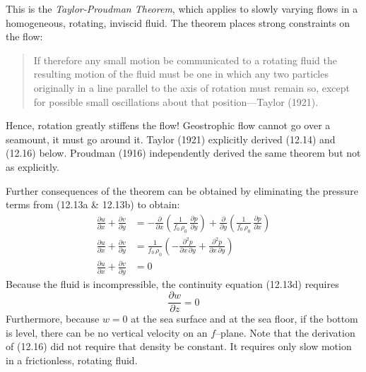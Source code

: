 This is the \textit{Taylor-Proudman Theorem}, which applies to slowly varying flows in a
homogeneous, rotating, inviscid fluid. The theorem places strong
constraints on the flow:
\begin{quotation} \small
If therefore any small motion be communicated to a rotating fluid the
resulting motion of the fluid must be one in which any two particles
originally in a line parallel to the axis of rotation must remain so,
except for possible small oscillations about that position---Taylor
(1921).
\end{quotation}
Hence, rotation greatly stiffens the flow! Geostrophic
flow cannot go over
a seamount, it must go around it. Taylor (1921) explicitly derived
(12.14) and (12.16) below. Proudman (1916) independently derived the
same theorem but not as explicitly.

Further consequences of the theorem can be obtained by eliminating the
pressure terms from (12.13a \& 12.13b) to obtain:
\begin{subequations}
\begin{align}
\frac{\partial{u}}{\partial{x}} + \frac{\partial{v}}{\partial{y}} &= -\frac{\partial }{\partial{x}} \left(\frac{1}{f_{0}\,\rho_{0}}\,
\frac{\partial{p}}{\partial{y}} \right) + \frac{\partial }{\partial{y}} \left(\frac{1}{f_{0}\,\rho_{0}}\,
\frac{\partial{p}}{\partial{x}} \right) \\
\frac{\partial{u}}{\partial{x}} + \frac{\partial{v}}{\partial{y}} &= \frac{1}{f_{0}\,\rho_{0}} \left( -\frac{\partial ^2 p}{\partial{x}\,\partial{y}} + \frac{\partial ^2
p}{\partial{x}\,\partial{y}} \right)  \\
\frac{\partial{u}}{\partial{x}} + \frac{\partial{v}}{\partial{y}} &= 0
\end{align}
\end{subequations}
Because the fluid is incompressible, the continuity equation (12.13d)
requires
\begin{equation}
\frac{\partial{w}}{\partial{z}} = 0
\end{equation}
Furthermore, because $w = 0$ at the sea surface and at the sea floor,
if the bottom is level, there can be no vertical velocity on an
$f$--plane. Note that the derivation of (12.16) did not require that
density be constant. It requires only slow motion in a frictionless,
rotating fluid.

